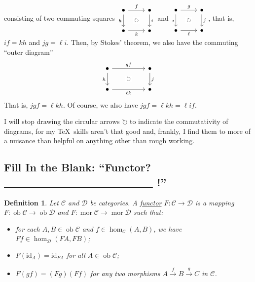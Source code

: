 \documentclass[a4paper,11pt]{article}
\theoremstyle{break_italics}
\newtheorem*{definition*}{Definition}
\theoremstyle{break_upright}
\theoremstyle{remark}
\newcommand{\id}{\mathrm{id}}
\newcommand{\ob}{\operatorname{ob}}
\newcommand{\mor}{\operatorname{mor}}
\newcommand{\C}{\mathcal{C}}
\newcommand{\D}{\mathcal{D}}
\begin{document}
consisting of two commuting squares $\begin{tikzcd}
	\bullet & \bullet \\
	\bullet & \bullet
	\arrow["f", from=1-1, to=1-2]
	\arrow["h"', from=1-1, to=2-1]
	\arrow["\circlearrowright"{description}, draw=none, from=1-1, to=2-2]
	\arrow["i", from=1-2, to=2-2]
	\arrow["k"', from=2-1, to=2-2]
\end{tikzcd}$ and $\begin{tikzcd}
	\bullet & \bullet \\
	\bullet & \bullet
	\arrow["g", from=1-1, to=1-2]
	\arrow["i"', from=1-1, to=2-1]
	\arrow["\circlearrowright"{description}, draw=none, from=1-1, to=2-2]
	\arrow["j", from=1-2, to=2-2]
	\arrow["\ell"', from=2-1, to=2-2]
\end{tikzcd}$, that is, $if = kh$ and $jg = \ell i$. Then, by Stokes' theorem, we also have the commuting ``outer diagram''
\[\begin{tikzcd}
	\bullet && \bullet \\
	\bullet && \bullet
	\arrow["gf", from=1-1, to=1-3]
	\arrow["h"', from=1-1, to=2-1]
	\arrow["\circlearrowright"{description}, draw=none, from=1-1, to=2-3]
	\arrow["j", from=1-3, to=2-3]
	\arrow["{\ell k}"', from=2-1, to=2-3]
\end{tikzcd}\]
That is, $jgf = \ell k h$. Of course, we also have $jgf = \ell k h = \ell if$.

I will stop drawing the circular arrows $\circlearrowright$ to indicate the commutativity of diagrams, for my \TeX\ skills aren't that good and, frankly, I find them to more of a nuisance than helpful on anything other than rough working.







\subsection{Fill In the Blank: ``Functor? \underline{ \ \ \ \ \ \ \ \ \ \ \ \ \ \ \ \ \ \ \ \ \ \ \ \ \ } !''}

\begin{definition*}
Let $\C$ and $\D$ be categories. A \uline{functor} $F \colon \C \to \D$ is a mapping $F \colon \ob\C \to \ob\D$ and $F \colon \mor\C\to\mor\D$ such that:
\begin{itemize}
	\item for each $A,B \in \ob\C$ and $f \in \hom_\C(A,B)$, we have $Ff \in \hom_\D(FA,FB)$;
	\item $F(\id_A) = \id_{FA}$ for all $A \in \ob\C$;
	\item $F(gf) = (Fg)(Ff)$ for any two morphisms $A \xrightarrow{f} B \xrightarrow{g} C$ in $\C$.
\end{itemize}
\end{definition*}
\end{document}
